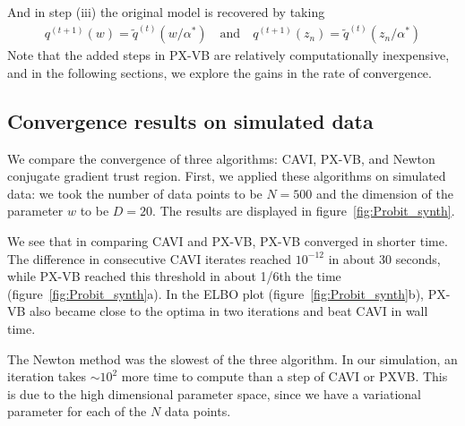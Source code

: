 \documentclass{article}
\begin{document}
And in step (iii) the original model is recovered by taking
\begin{align}
    q^{(t+1)}(w) = \tilde q^{(t)}(w/\alpha^*) \quad \text{and} \quad q^{(t+1)}(z_n) = \tilde q^{(t)}(z_n/\alpha^*)
\end{align}
Note that the added steps in PX-VB are relatively computationally inexpensive, and in the following sections, we explore the gains in the rate of convergence. 

\subsection{Convergence results on simulated data}
We compare the convergence of three algorithms: CAVI, PX-VB, and Newton conjugate gradient trust region. First, we applied these algorithms on simulated data: we took the number of data points to be $N = 500$ and the dimension of the parameter $w$ to be $D= 20$. The results are displayed in figure~\ref{fig:Probit_synth}. 

We see that in comparing CAVI and PX-VB, PX-VB converged in shorter time. The difference in consecutive CAVI iterates reached $10^{-12}$ in about 30 seconds, while PX-VB reached this threshold in about 1/6th the time (figure~\ref{fig:Probit_synth}a). In the ELBO plot (figure~\ref{fig:Probit_synth}b), PX-VB also became close to the optima in two iterations and beat CAVI in wall time. 

The Newton method was the slowest of the three algorithm. In our simulation, an iteration takes $\sim10^2$ more time to compute than a step of CAVI or PXVB. This is due to the high dimensional parameter space, since we have a variational parameter for each of the $N$ data points. 
\end{document}
